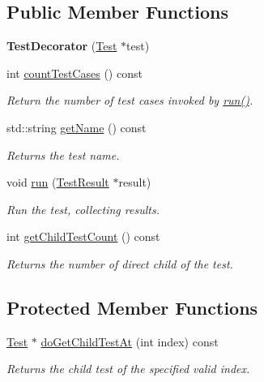 \subsection*{Public Member Functions}
\begin{DoxyCompactItemize}
\item 
\hypertarget{class_test_decorator_a227e67c84146b23a37b44c24877b45d9}{{\bfseries Test\-Decorator} (\hyperlink{class_test}{Test} $\ast$test)}\label{class_test_decorator_a227e67c84146b23a37b44c24877b45d9}

\item 
int \hyperlink{class_test_decorator_add3b489dfb3331eba0aee7e06b03548b}{count\-Test\-Cases} () const 
\begin{DoxyCompactList}\small\item\em Return the number of test cases invoked by \hyperlink{class_test_decorator_a64dd70aae76f31f2e2f7b5ac84a8e829}{run()}. \end{DoxyCompactList}\item 
std\-::string \hyperlink{class_test_decorator_acdcf679bba926032d2e4535fca1e9cf0}{get\-Name} () const 
\begin{DoxyCompactList}\small\item\em Returns the test name. \end{DoxyCompactList}\item 
\hypertarget{class_test_decorator_a64dd70aae76f31f2e2f7b5ac84a8e829}{void \hyperlink{class_test_decorator_a64dd70aae76f31f2e2f7b5ac84a8e829}{run} (\hyperlink{class_test_result}{Test\-Result} $\ast$result)}\label{class_test_decorator_a64dd70aae76f31f2e2f7b5ac84a8e829}

\begin{DoxyCompactList}\small\item\em Run the test, collecting results. \end{DoxyCompactList}\item 
\hypertarget{class_test_decorator_aa2fbf0467c6bd599f912415a097e087c}{int \hyperlink{class_test_decorator_aa2fbf0467c6bd599f912415a097e087c}{get\-Child\-Test\-Count} () const }\label{class_test_decorator_aa2fbf0467c6bd599f912415a097e087c}

\begin{DoxyCompactList}\small\item\em Returns the number of direct child of the test. \end{DoxyCompactList}\end{DoxyCompactItemize}
\subsection*{Protected Member Functions}
\begin{DoxyCompactItemize}
\item 
\hyperlink{class_test}{Test} $\ast$ \hyperlink{class_test_decorator_a029da80376365525d52387a88e6837f4}{do\-Get\-Child\-Test\-At} (int index) const 
\begin{DoxyCompactList}\small\item\em Returns the child test of the specified valid index. \end{DoxyCompactList}\end{DoxyCompactItemize}
